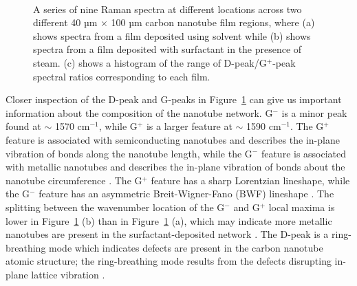 \documentclass[
  a4paper,
]{scrbook}
\begin{document}
\begin{figure}
\begin{minipage}[t]{0.72\linewidth}
{{}

}

\end{minipage}%
%
\begin{minipage}[t]{0.14\linewidth}

{\centering 

~

}

\end{minipage}%

\caption[Raman spectra at different locations across two different 40 µm
\(\times\) 100 µm carbon nanotube film regions, along with a histogram
of D-peak/G\(^+\)-peak spectral ratios corresponding to each
film.]{\label{fig-pristine-raman}A series of nine Raman spectra at
different locations across two different 40 µm \(\times\) 100 µm carbon
nanotube film regions, where (a) shows spectra from a film deposited
using solvent while (b) shows spectra from a film deposited with
surfactant in the presence of steam. (c) shows a histogram of the range
of D-peak/G\(^+\)-peak spectral ratios corresponding to each film.}

\end{figure}

Closer inspection of the D-peak and G-peaks in
Figure~\ref{fig-pristine-raman} can give us important information about
the composition of the nanotube network. G\(^-\) is a minor peak found
at \(\sim\) 1570 cm\(^{-1}\), while G\(^+\) is a larger feature at
\(\sim\) 1590 cm\(^{-1}\). The G\(^+\) feature is associated with
semiconducting nanotubes and describes the in-plane vibration of bonds
along the nanotube length, while the G\(^-\) feature is associated with
metallic nanotubes and describes the in-plane vibration of bonds about
the nanotube circumference \autocite{King2014,Swiniarski2021}. The
G\(^+\) feature has a sharp Lorentzian lineshape, while the G\(^-\)
feature has an asymmetric Breit-Wigner-Fano (BWF) lineshape
\autocite{Blackburn2006,Swiniarski2021}. The splitting between the
wavenumber location of the G\(^-\) and G\(^+\) local maxima is lower in
Figure~\ref{fig-pristine-raman} (b) than in
Figure~\ref{fig-pristine-raman} (a), which may indicate more metallic
nanotubes are present in the surfactant-deposited network
\autocite{Swiniarski2021}. The D-peak is a ring-breathing mode which
indicates defects are present in the carbon nanotube atomic structure;
the ring-breathing mode results from the defects disrupting in-plane
lattice vibration
\autocite{King2014,CuentasGallegos2011,Swiniarski2021}.
\end{document}
